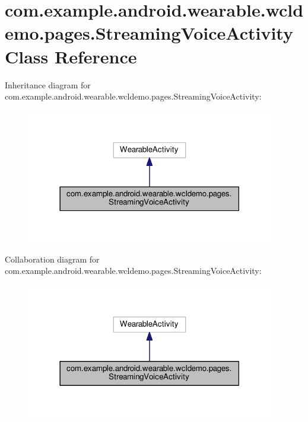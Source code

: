 \hypertarget{classcom_1_1example_1_1android_1_1wearable_1_1wcldemo_1_1pages_1_1StreamingVoiceActivity}{}\section{com.\+example.\+android.\+wearable.\+wcldemo.\+pages.\+Streaming\+Voice\+Activity Class Reference}
\label{classcom_1_1example_1_1android_1_1wearable_1_1wcldemo_1_1pages_1_1StreamingVoiceActivity}


Inheritance diagram for com.\+example.\+android.\+wearable.\+wcldemo.\+pages.\+Streaming\+Voice\+Activity\+:
\nopagebreak
\begin{figure}[H]
\begin{center}
\leavevmode
\includegraphics[width=306pt]{d0/d23/classcom_1_1example_1_1android_1_1wearable_1_1wcldemo_1_1pages_1_1StreamingVoiceActivity__inherit__graph}
\end{center}
\end{figure}


Collaboration diagram for com.\+example.\+android.\+wearable.\+wcldemo.\+pages.\+Streaming\+Voice\+Activity\+:
\nopagebreak
\begin{figure}[H]
\begin{center}
\leavevmode
\includegraphics[width=306pt]{d6/db5/classcom_1_1example_1_1android_1_1wearable_1_1wcldemo_1_1pages_1_1StreamingVoiceActivity__coll__graph}
\end{center}
\end{figure}
